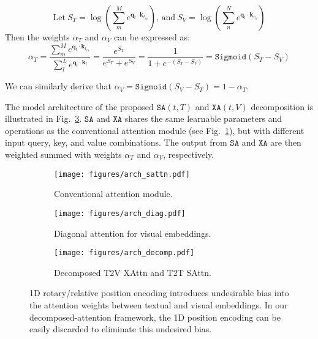 \begin{equation}
\text{Let}\ S_T = \log\left(\sum_{m}^{M} e^{\bm{q}_{t}\cdot \bm{k}_{t_m}}\right) \text{, and}\ S_V = \log\left(\sum_{n}^{N} e^{\bm{q}_{t}\cdot \bm{k}_{v_n}}\right)
\end{equation}
Then the weights $\alpha_T$ and $\alpha_V$ can be expressed as:
\begin{equation}
\alpha_T
= \frac{\sum_{m}^{M} e^{\bm{q}_{t}\cdot \bm{k}_{t_m}}}{\sum_{l}^{L} e^{\bm{q}_{t}\cdot \bm{k}_{l}}}
= \frac{e^{S_T}}{e^{S_T}+e^{S_V}}
= \frac{1}{1+e^{-(S_{T}-S_{V})}}
= \texttt{Sigmoid}(S_T - S_V)
\end{equation}

We can similarly derive that $\alpha_V=\texttt{Sigmoid}(S_V - S_T) = 1-\alpha_T$.

The model architecture of the proposed $\texttt{SA}(t,T)$ and $\texttt{XA}(t,V)$ decomposition is illustrated in Fig.~\ref{fig:arch-decomp}.
$\texttt{SA}$ and $\texttt{XA}$ shares the same learnable parameters and operations as the conventional attention module (see Fig.~\ref{fig:arch-sattn}), but with different input query, key, and value combinations.
The output from $\texttt{SA}$ and $\texttt{XA}$ are then weighted summed with weights $\alpha_T$ and $\alpha_V$, respectively.

\begin{figure*}[t]
\centering
\begin{subfigure}{.22\linewidth}
  \centering
  \texttt{[image: figures/arch\_sattn.pdf]}
  \caption{Conventional attention module.}\label{fig:arch-sattn}
\end{subfigure}
\hfill
\begin{subfigure}{.22\linewidth}
  \centering
  \texttt{[image: figures/arch\_diag.pdf]}
  \caption{Diagonal attention for visual embeddings.}\label{fig:arch-diag}
\end{subfigure}
\hfill
\begin{subfigure}{.45\linewidth}
  \centering
  \texttt{[image: figures/arch\_decomp.pdf]}
  \caption{Decomposed T2V XAttn and T2T SAttn.}\label{fig:arch-decomp}
\end{subfigure}
\caption{
1D rotary/relative position encoding introduces undesirable bias into the attention weights between textual and visual embeddings.
In our decomposed-attention framework, the 1D position encoding can be easily discarded to eliminate this undesired bias.
}\label{fig:pos}
\end{figure*}


